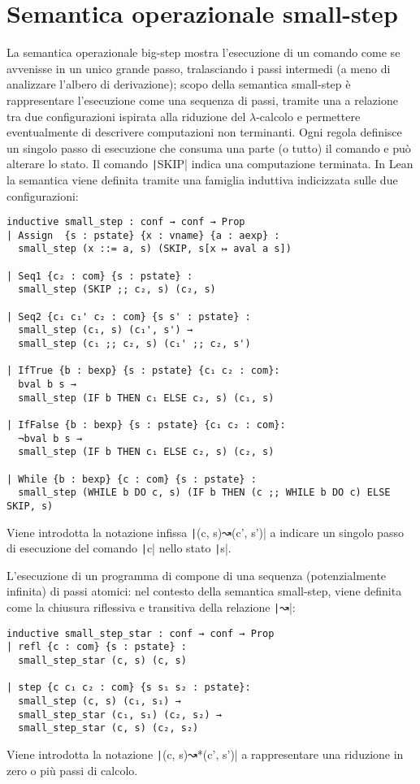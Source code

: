 \section{Semantica operazionale small-step}
La semantica operazionale big-step mostra l'esecuzione di un comando come se avvenisse in un unico grande passo, tralasciando i passi intermedi (a meno di analizzare l'albero di derivazione); scopo della semantica small-step è rappresentare l'esecuzione come una sequenza di passi, tramite una a relazione tra due configurazioni ispirata alla riduzione del $\lambda$-calcolo e permettere eventualmente di descrivere computazioni non terminanti. Ogni regola definisce un singolo passo di esecuzione che consuma una parte (o tutto) il comando e può alterare lo stato. Il comando \texttt|SKIP| indica una computazione terminata. In Lean la semantica viene definita tramite una famiglia induttiva indicizzata sulle due configurazioni:
\begin{verbatim}
inductive small_step : conf → conf → Prop
| Assign  {s : pstate} {x : vname} {a : aexp} :
  small_step (x ::= a, s) (SKIP, s[x ↦ aval a s])

| Seq1 {c₂ : com} {s : pstate} :
  small_step (SKIP ;; c₂, s) (c₂, s)

| Seq2 {c₁ c₁' c₂ : com} {s s' : pstate} :
  small_step (c₁, s) (c₁', s') →
  small_step (c₁ ;; c₂, s) (c₁' ;; c₂, s')

| IfTrue {b : bexp} {s : pstate} {c₁ c₂ : com}:
  bval b s →
  small_step (IF b THEN c₁ ELSE c₂, s) (c₁, s)

| IfFalse {b : bexp} {s : pstate} {c₁ c₂ : com}:
  ¬bval b s →
  small_step (IF b THEN c₁ ELSE c₂, s) (c₂, s)

| While {b : bexp} {c : com} {s : pstate} :
  small_step (WHILE b DO c, s) (IF b THEN (c ;; WHILE b DO c) ELSE SKIP, s)
\end{verbatim}
Viene introdotta la notazione infissa \texttt|(c, s)↝(c', s')| a indicare un singolo passo di esecuzione del comando \texttt|c| nello stato \texttt|s|.

L'esecuzione di un programma di compone di una sequenza (potenzialmente infinita) di passi atomici: nel contesto della semantica small-step, viene definita come la chiusura riflessiva e transitiva della relazione \texttt|↝|:
\begin{verbatim}
inductive small_step_star : conf → conf → Prop
| refl {c : com} {s : pstate} : 
  small_step_star (c, s) (c, s)

| step {c c₁ c₂ : com} {s s₁ s₂ : pstate}:
  small_step (c, s) (c₁, s₁) →
  small_step_star (c₁, s₁) (c₂, s₂) →
  small_step_star (c, s) (c₂, s₂)
\end{verbatim}
Viene introdotta la notazione \texttt|(c, s)↝*(c', s')| a rappresentare una riduzione in zero o più passi di calcolo.

